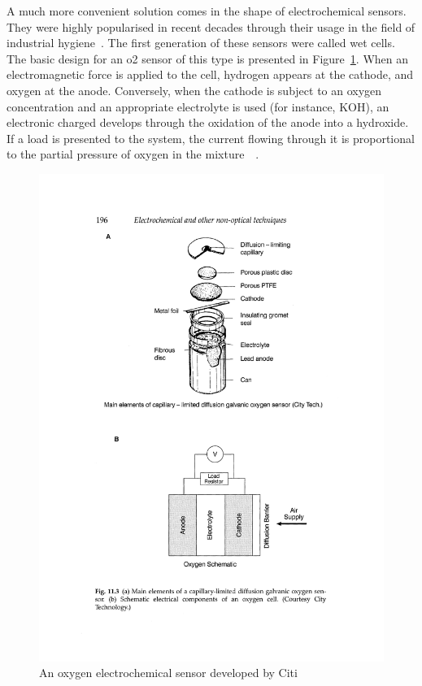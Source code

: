 A much more convenient solution comes in the shape of electrochemical
sensors. They were highly popularised in recent decades through their
usage in the field of industrial hygiene~\cite{Clark1997}. The first
generation of these sensors were called wet cells. The basic design for
an \gls{o2} sensor of this type is presented in
Figure~\ref{fig:electrochemical_wet_cell}. When an electromagnetic force
is applied to the cell, hydrogen appears at the cathode, and oxygen at
the anode. Conversely, when the cathode is subject to an oxygen
concentration and an appropriate electrolyte is used (for instance,
KOH), an electronic charged develops through the oxidation of the anode
into a hydroxide. If a load is presented to the system, the current
flowing through it is proportional to the partial pressure of oxygen in
the mixture~\cite{Dhall2021, Clark1997}~.

\begin{figure}[htpb]
    \centering
    \includegraphics[trim=6cm 6.2cm 4cm 16cm, clip]{img/pdf/clark_193.pdf}
    \caption{An oxygen electrochemical sensor developed by Citi}%
    \label{fig:electrochemical_wet_cell}
\end{figure}

